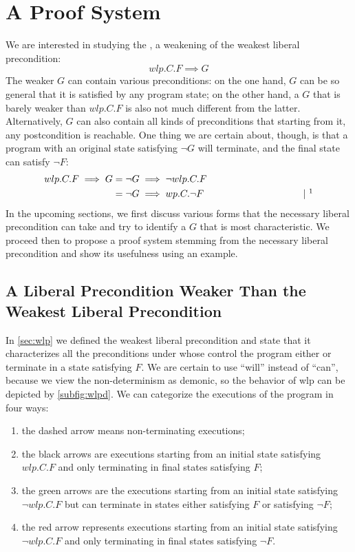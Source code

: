 \chapter{A Proof System}\label{ch:system} %
We are interested in studying the , a weakening of the weakest liberal precondition: 
$$wlp.C.F\implies G$$
The weaker $G$ can contain various preconditions: on the one hand, $G$ can be so general that it is satisfied by any program state; on the other hand, a $G$ that is barely weaker than $wlp.C.F$ is also not much different from the latter. 
Alternatively, $G$ can also contain all kinds of preconditions that starting from it, any postcondition is reachable. 
One thing we are certain about, though, is that a program with an original state satisfying $\neg G$ will terminate, and the final state can satisfy $\neg F$: 
\begin{align*}
wlp.C.F\implies G & = \neg G \implies \neg wlp.C.F \\
	& = \neg G \implies wp.C.\neg F 
	\hspace{0.3\textwidth} | \ \todo{insert theorem: wlp and wp are conjugates} 
\end{align*}
In the upcoming sections, we first discuss various forms that the necessary liberal precondition can take and try to identify a $G$ that is most characteristic. 
We proceed then to propose a proof system stemming from the necessary liberal precondition and show its usefulness using an example.  

\section{A Liberal Precondition Weaker Than the Weakest Liberal Precondition }
In \autoref{sec:wlp} we defined the weakest liberal precondition and state that it characterizes all the preconditions under whose control the program either  or  terminate in a state satisfying $F$. 
We are certain to use ``will'' instead of ``can'', because we view the non-determinism as demonic, so the behavior of wlp can be depicted by \autoref{subfig:wlpd}. 
We can categorize the executions of the program in four ways: 
\begin{enumerate}
	\item the dashed arrow means non-terminating executions; 
	\item the black arrows are executions starting from an initial state satisfying $wlp.C.F$ and only terminating in final states satisfying $F$; 
	\item the green arrows are the executions starting from an initial state satisfying $\neg wlp.C.F$ but can terminate in states either satisfying $F$ or satisfying $\neg F$;
	\item the red arrow represents executions starting from an initial state satisfying $\neg wlp.C.F$ and only terminating in final states satisfying $\neg F$. 
\end{enumerate}

